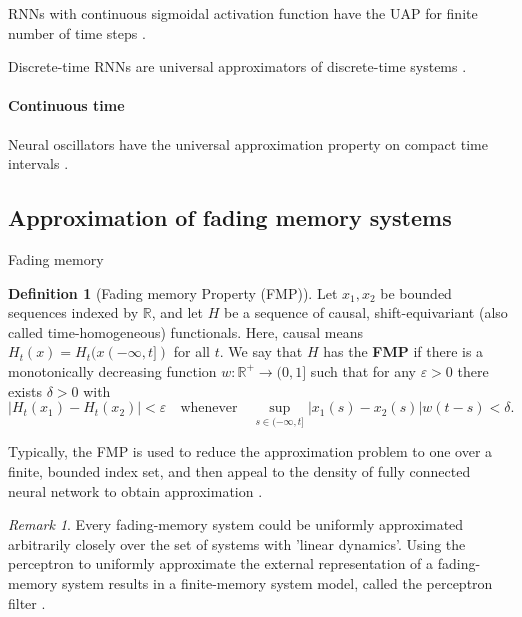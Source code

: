 \documentclass{article}
\theoremstyle{definition}
\newtheorem{definition}{Definition}
\theoremstyle{remark}
\newtheorem{remark}{Remark}
\begin{document}
RNNs with continuous sigmoidal activation function have the UAP for finite number of time steps \citep{schafer2007}.

Discrete-time RNNs are universal approximators of discrete-time systems \citep{aguiar2023universal}.

\paragraph{Continuous time}
Neural oscillators have the universal approximation property on compact time intervals \citep{lanthaler2023neuraloscillators}.



\subsection{Approximation of fading memory systems}
Fading memory \citep{boyd1985fading}


\begin{definition}[Fading memory Property (FMP)]
Let $x_1, x_2$ be bounded sequences indexed by $\mathbb{R}$, and let $H$ be a sequence of causal, shift-equivariant (also called time-homogeneous) functionals.
Here, causal means $H_t(x) = H_t(x(-\infty,t])$ for all $t$.
We say that $H$ has the \textbf{FMP} if there is a monotonically decreasing function $w : \mathbb{R}^+ \to (0, 1]$ such that for any $\varepsilon > 0$ there exists $\delta > 0$ with 
\[
|H_t(x_1) - H_t(x_2)| < \varepsilon \quad \text{whenever} \quad \sup_{s \in (-\infty, t]} |x_1(s) - x_2(s)| w(t - s) < \delta.
\]
\end{definition}

 Typically, the FMP is used to reduce the approximation problem to one over a finite, bounded index set, and then appeal to the density of fully connected neural network to obtain approximation \citep{gonon2021fading}. %


\begin{remark}
Every fading-memory system could be uniformly approximated arbitrarily closely over the set of systems with 'linear dynamics'\citep{matthews1993approximating}. %
Using the perceptron to uniformly approximate the external representation of a fading-memory system results in a finite-memory system model, called the perceptron filter \citep{matthews1993approximating}.
\end{remark}
\end{document}
